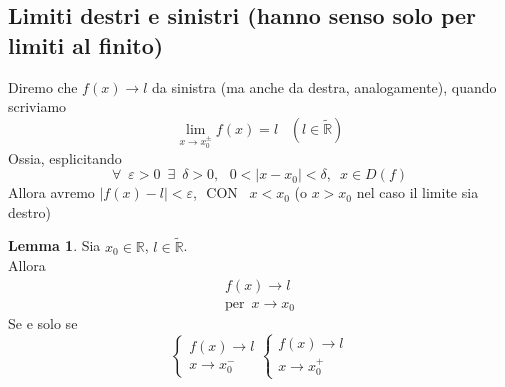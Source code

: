 \documentclass{article}
\theoremstyle{definition}
\newtheorem{lem}{Lemma}
\begin{document}
\subsection{Limiti destri e sinistri (hanno senso solo per limiti al finito)}
Diremo che $f(x) \to l$ da sinistra (ma anche da destra, analogamente), quando scriviamo
\begin{equation}
    \lim_{x \to x_0^\pm}f(x)=l \,\,\,\,\, (l \in \tilde{\mathbb{R}})
\end{equation}
Ossia, esplicitando
\begin{equation}
    \forall \,\,\, \varepsilon>0 \,\,\, \exists \,\,\, \delta>0, \,\,\,\, 0<|x-x_0|<\delta, \,\,\, x \in D(f)
\end{equation}
Allora avremo $|f(x)-l|<\varepsilon$,\,\, CON\,\,\, $x < x_0$ (o $x>x_0$ nel caso il limite sia destro)
\begin{lem}
    Sia $x_0 \in \mathbb{R}$, $l \in \tilde{\mathbb{R}}$.
    \\
    Allora
    \begin{align*}
        f(x) \to l \\
      \mbox{per} \,\,\,  x \to x_0
    \end{align*}
    Se e solo se
    \begin{equation}
        \begin{cases}
            f(x) \to l
            \\ x \to x_0^-
        \end{cases}
        \begin{cases}
            f(x) \to l \\
            x \to x_0^+
        \end{cases}
    \end{equation}
\end{lem}
\end{document}

